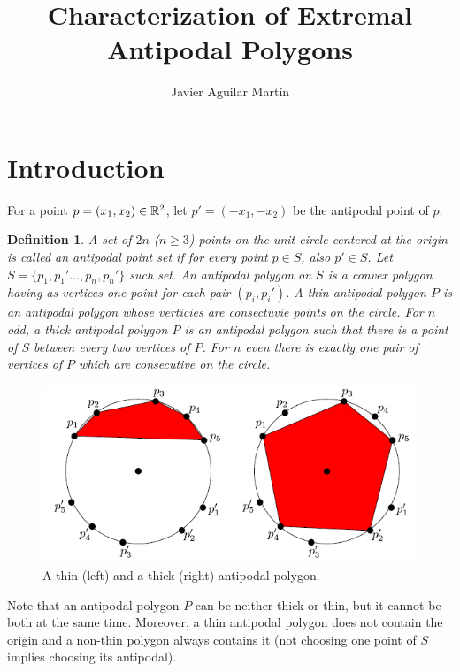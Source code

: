 \documentclass[twoside]{article}
\newtheorem{defin}{Definition}[section]
\begin{document}
\title{Characterization of Extremal Antipodal Polygons}
\author{Javier Aguilar Martín}
\maketitle

\section{Introduction}

For a point $p=(x_1,x_2)\in\mathbb{R}^2$, let $p'=(-x_1,-x_2)$ be the antipodal point of $p$.

\begin{defin}
A set of $2n$ ($n\geq 3$) points on the unit circle centered at the origin is called an \emph{antipodal point set} if for every point $p\in S$, also $p'\in S$. Let $S=\{p_1,p_1'\dots,p_n,p_n'\}$ such set. An \emph{antipodal polygon} on $S$ is a convex polygon  having as vertices one point for each pair $(p_i,p_i')$. A \emph{thin} antipodal polygon $P$ is an antipodal polygon whose verticies are consectuvie points on the circle. For $n$ odd, a \emph{thick} antipodal polygon $P$ is an antipodal polygon such that there is a point of $S$ between every two vertices of $P$. For $n$ even there is exactly one pair of vertices of $P$ which are consecutive on the circle. 
\end{defin}

\begin{figure}[h!]
\centering
\includegraphics[scale=0.7]{fig1}
\caption{A thin (left) and a thick (right) antipodal polygon.}
\end{figure}
 
 
 Note that an antipodal polygon $P$ can be neither thick or thin, but it cannot be both at the same time. Moreover, a thin antipodal polygon does not contain the origin and a non-thin polygon always contains it (not choosing one point of $S$ implies choosing its antipodal). 
 
\end{document}
